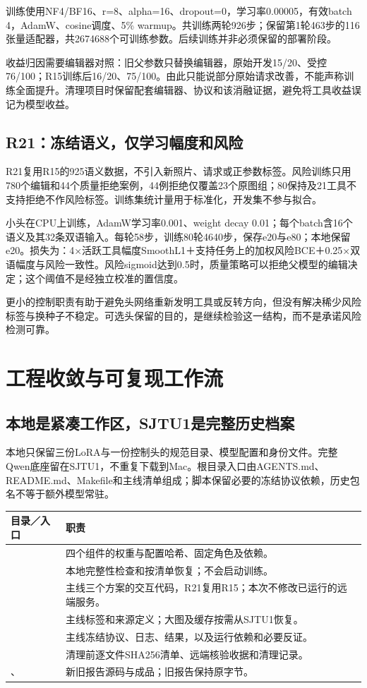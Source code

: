 \documentclass[UTF8,fontset=none,zihao=5,a4paper]{ctexart}
\begin{document}
训练使用NF4/BF16、r=8、alpha=16、dropout=0，学习率0.00005，有效batch 4，AdamW、cosine调度、5\% warmup。共训练两轮926步；保留第1轮463步的116张量适配器，共2674688个可训练参数。后续训练并非必须保留的部署阶段。

收益归因需要编辑器对照：旧父参数只替换编辑器，原始开发15/20、受控76/100；R15训练后16/20、75/100。由此只能说部分原始请求改善，不能声称训练全面提升。清理项目时保留配套编辑器、协议和该消融证据，避免将工具收益误记为模型收益。

\subsection{R21：冻结语义，仅学习幅度和风险}
R21复用R15的925语义数据，不引入新照片、请求或正参数标签。风险训练只用780个编辑和44个质量拒绝案例，44例拒绝仅覆盖23个原图组；80保持及21工具不支持拒绝不作风险标签。训练集统计量用于标准化，开发集不参与拟合。

小头在CPU上训练，AdamW学习率0.001、weight decay 0.01；每个batch含16个语义及其32条双语输入。每轮58步，训练80轮4640步，保存e20与e80；本地保留e20。损失为：4×活跃工具幅度SmoothL1＋支持任务上的加权风险BCE＋0.25×双语幅度与风险一致性。风险sigmoid达到0.5时，质量策略可以拒绝父模型的编辑决定；这个阈值不是经独立校准的置信度。

更小的控制职责有助于避免头网络重新发明工具或反转方向，但没有解决稀少风险标签与换种子不稳定。可选头保留的目的，是继续检验这一结构，而不是承诺风险检测可靠。

\section{工程收敛与可复现工作流}
\subsection{本地是紧凑工作区，SJTU1是完整历史档案}
本地只保留三份LoRA与一份控制头的规范目录、模型配置和身份文件。完整Qwen底座留在SJTU1，不重复下载到Mac。根目录入口由AGENTS.md、README.md、Makefile和主线清单组成；脚本保留必要的冻结协议依赖，历史包名不等于额外模型常驻。

\noindent\begin{tabularx}{\linewidth}{@{}P{4.3cm}Y@{}}\toprule
目录／入口 & 职责\\\midrule
{} & 四个组件的权重与配置哈希、固定角色及依赖。\\
 & 本地完整性检查和按清单恢复；不会启动训练。\\
 & 主线三个方案的交互代码，R21复用R15；本次不修改已运行的远端服务。\\
 & 主线标签和来源定义；大图及缓存按需从SJTU1恢复。\\
 & 主线冻结协议、日志、结果，以及运行依赖和必要反证。\\
 & 清理前逐文件SHA256清单、远端核验收据和清理记录。\\
、 & 新旧报告源码与成品；旧报告保持原字节。\\\bottomrule
\end{tabularx}
\end{document}
